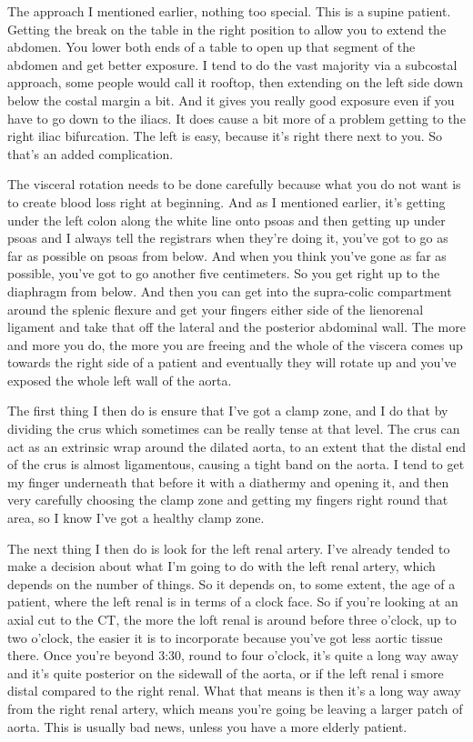 \documentclass[
]{book}
\begin{document}
The approach I mentioned earlier, nothing too special. This is a supine
patient. Getting the break on the table in the right position to allow
you to extend the abdomen. You lower both ends of a table to open up
that segment of the abdomen and get better exposure. I tend to do the
vast majority via a subcostal approach, some people would call it
rooftop, then extending on the left side down below the costal margin a
bit. And it gives you really good exposure even if you have to go down
to the iliacs. It does cause a bit more of a problem getting to the
right iliac bifurcation. The left is easy, because it's right there next
to you. So that's an added complication.

The visceral rotation needs to be done carefully because what you do not
want is to create blood loss right at beginning. And as I mentioned
earlier, it's getting under the left colon along the white line onto
psoas and then getting up under psoas and I always tell the registrars
when they're doing it, you've got to go as far as possible on psoas from
below. And when you think you've gone as far as possible, you've got to
go another five centimeters. So you get right up to the diaphragm from
below. And then you can get into the supra-colic compartment around the
splenic flexure and get your fingers either side of the lienorenal
ligament and take that off the lateral and the posterior abdominal wall.
The more and more you do, the more you are freeing and the whole of the
viscera comes up towards the right side of a patient and eventually they
will rotate up and you've exposed the whole left wall of the aorta.

The first thing I then do is ensure that I've got a clamp zone, and I do
that by dividing the crus which sometimes can be really tense at that
level. The crus can act as an extrinsic wrap around the dilated aorta,
to an extent that the distal end of the crus is almost ligamentous,
causing a tight band on the aorta. I tend to get my finger underneath
that before it with a diathermy and opening it, and then very carefully
choosing the clamp zone and getting my fingers right round that area, so
I know I've got a healthy clamp zone.

The next thing I then do is look for the left renal artery. I've already
tended to make a decision about what I'm going to do with the left renal
artery, which depends on the number of things. So it depends on, to some
extent, the age of a patient, where the left renal is in terms of a
clock face. So if you're looking at an axial cut to the CT, the more the
loft renal is around before three o'clock, up to two o'clock, the easier
it is to incorporate because you've got less aortic tissue there. Once
you're beyond 3:30, round to four o'clock, it's quite a long way away
and it's quite posterior on the sidewall of the aorta, or if the left
renal i smore distal compared to the right renal. What that means is
then it's a long way away from the right renal artery, which means
you're going be leaving a larger patch of aorta. This is usually bad
news, unless you have a more elderly patient.
\end{document}
